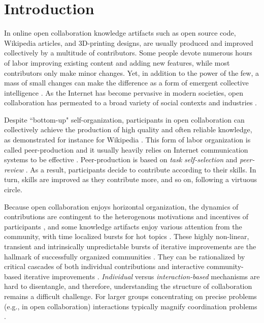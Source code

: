 \section{Introduction}
In online open collaboration knowledge artifacts such as open source code, Wikipedia articles, and 3D-printing designs, are usually produced and improved collectively by a multitude of contributors. Some people devote numerous hours of labor improving existing content and adding new features, while most contributors only make minor changes. Yet, in addition to the power of the few, a mass of small changes can make the difference as a form of emergent collective intelligence \cite{kittur2007power}.  As the Internet has become pervasive in modern societies, open collaboration has permeated to a broad variety of social contexts and industries \cite{benkler2011leviathan}. 

Despite ``bottom-up" self-organization, participants in open collaboration can collectively achieve  the production of high quality and often reliable knowledge, as demonstrated for instance for Wikipedia \cite{giles2005internet}. This form of labor organization is called peer-production and it usually heavily relies on Internet communication systems to be effective \cite{benkler2002}. Peer-production is based on {\it task self-selection} and {\it peer-review} \cite{benkler2002}. As a result, participants decide to contribute according to their skills. In turn, skills are improved as they contribute more, and so on, following a virtuous circle.

Because open collaboration enjoys horizontal organization, the dynamics of contributions are contingent to the heterogenous motivations and incentives of participants \cite{vonKrogh2012}, and some knowledge artifacts enjoy various attention from the community, with time localized bursts for hot topics \cite{keegan2013hotoff}. These  highly non-linear, transient and intrinsically unpredictable bursts of iterative improvements are the hallmark of successfully organized communities \cite{vonkrogh2014designing}. They can be rationalized by critical cascades of both individual contributions and interactive community-based iterative improvements \cite{sornette2014howmuch}. {\it Individual} versus {\it interaction-based} mechanisms are hard to disentangle, and therefore, understanding the structure of collaboration remains a difficult challenge. For larger groups concentrating on precise problems (e.g., in open collaboration) interactions typically magnify coordination problems \cite{halfaker2013}. %


